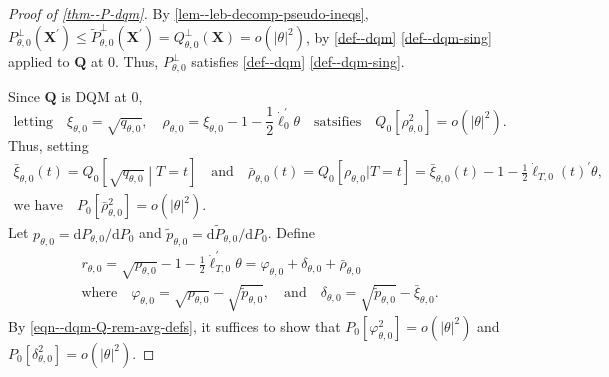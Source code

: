 \documentclass[12pt]{article}
\let\Cref\autoref
\theoremstyle{definition}
\theoremstyle{plain}
\begin{document}
\begin{proof}[Proof of \Cref{thm--P-dqm}]
By \Cref{lem--leb-decomp-pseudo-ineqs},
\(P_{\theta, 0}^{\perp} \left( \mathbf{X}^{\prime} \right) \leq
\tilde{P}_{\theta, 0}^{\perp} \left( \mathbf{X}^{\prime} \right) =
Q_{\theta, 0}^{\perp} (\mathbf{X}) = o \left( |\theta|^{2} \right)\), by
\Cref{def--dqm} \ref{def--dqm-sing} applied to \(\mathbf{Q}\) at 0.
Thus, \(P_{\theta, 0}^{\perp}\) satisfies
\Cref{def--dqm} \ref{def--dqm-sing}.

Since \(\mathbf{Q}\) is DQM at 0,
\begin{equation}
  \text{letting} \quad \xi_{\theta, 0} = \sqrt{q_{\theta, 0}}, \quad
  \rho_{\theta, 0} = \xi_{\theta, 0} - 1 - \frac{1}{2}
  \dot{\ell}_{0}^{\prime} \theta \quad \text{satsifies} \quad Q_{0} \left[
  \rho_{\theta, 0}^{2} \right] = o \left( |\theta|^{2} \right).
  \label{eqn--dqm-Q-rem}
\end{equation}
Thus, setting
\begin{equation}
  \begin{gathered}
  \bar{\xi}_{\theta, 0} (t) = Q_{0} \left[ \sqrt{q_{\theta, 0}} \middle| T = t
  \right] \quad \text{and} \quad
  \bar{\rho}_{\theta, 0} (t) = Q_{0} \left[ \rho_{\theta, 0} | T = t \right] =
  \bar{\xi}_{\theta, 0} (t) - 1 - \frac{1}{2} \dot{\ell}_{T, 0} (t)^{\prime}
  \theta, \\
  \text{we have} \quad
  P_{0} \left[ \bar{\rho}_{\theta, 0}^{2} \right] = o \left( |\theta|^{2}
  \right).
  \end{gathered}
  \label{eqn--dqm-Q-rem-avg-defs}
\end{equation}
Let \(p_{\theta, 0} = \mathrm{d} P_{\theta, 0} / \mathrm{d} P_{0}\) and
\(\tilde{p}_{\theta, 0} = \mathrm{d} \tilde{P}_{\theta, 0} / \mathrm{d} P_{0}\).
Define
\begin{equation}
  \begin{gathered}
    r_{\theta, 0} = \sqrt{p_{\theta, 0}} - 1 - \frac{1}{2} \dot{\ell}_{T,
    0}^{\prime} \theta = \varphi_{\theta, 0} + \delta_{\theta, 0} +
    \bar{\rho}_{\theta, 0} \\
    \text{where} \quad
    \varphi_{\theta, 0} = \sqrt{p_{\theta, 0}} - \sqrt{\tilde{p}_{\theta, 0}},
    \quad \text{and} \quad
    \delta_{\theta, 0} = \sqrt{\tilde{p}_{\theta, 0}} - \bar{\xi}_{\theta, 0}.
  \end{gathered}
  \label{eqn--dqm-P-rem-def}
\end{equation}
By \eqref{eqn--dqm-Q-rem-avg-defs}, it suffices to show that
\(P_{0} \left[ \varphi_{\theta, 0}^{2} \right] = o \left( |\theta|^{2} \right)\)
and \(P_{0} \left[ \delta_{\theta, 0}^{2} \right] = o \left( |\theta|^{2}
\right)\).


\end{proof}
\end{document}
